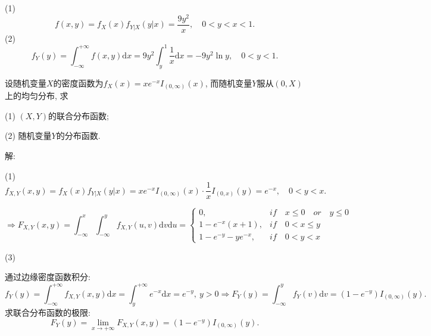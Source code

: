 \documentclass[standard]{ExBook}
\begin{document}
\begin{qitems}
\begin{bbox}
(1)
$$f(x,y)=f_{X}(x)f_{Y|X}(y|x)=\displaystyle\frac{9y^2}{x},\quad 0<y<x<1.$$
(2)
$$f_{Y}(y)=\displaystyle\int_{-\infty}^{+\infty}f(x,y)\mathrm{d}x=9y^2\int_{y}^{1}\frac{1}{x}\mathrm{d}x=-9y^2\ln y,\quad 0<y<1.$$
    \end{bbox}

\vspace{-5em}

    \begin{bbox}
    \begin{shaded}
        \qitem
设随机变量$X$的密度函数为$f_{X}(x)=x e^{-x}I_{(0,\infty)}(x)$, 而随机变量$Y$服从$(0,X)$上的均匀分布, 求

(1) $(X,Y)$的联合分布函数;

(2) 随机变量$Y$的分布函数.
    \end{shaded}
    \end{bbox}

\vspace{-5em}

    \begin{bbox}
解: 

(1)
$$f_{X,Y}(x,y)=f_{X}(x)f_{Y|X}(y|x)=x e^{-x}I_{(0,\infty)}(x)\cdot \frac{1}{x}I_{(0,x)}(y)=e^{-x},\quad 0<y<x.$$
\vspace{-2em}
\begin{center}
\begin{equation}
    \Longrightarrow
    F_{X,Y}(x,y)=\displaystyle\int_{-\infty}^{x}\int_{-\infty}^{y}f_{X,Y}(u,v)\mathrm{d}v\mathrm{d}u=
    \left\{
    \begin{array}{cl}
        \nonumber
        0, & if\quad x\leq0\quad or\quad y\leq0\\
        1-e^{-x}(x+1), & if\quad 0<x\leq y\\
        1-e^{-y}-ye^{-x}, & if\quad 0<y<x
    \end{array}
    \right.
\end{equation}
\end{center}
(3)

 通过边缘密度函数积分:
$$f_{Y}(y)=\int_{-\infty}^{+\infty}f_{X,Y}(x,y)\mathrm{d}x=\int_{y}^{+\infty}e^{-x}\mathrm{d}x=e^{-y},\ y>0 \Longrightarrow F_{Y}(y)=\int_{-\infty}^{y}f_{Y}(v)\mathrm{d}v=(1-e^{-y})I_{(0,\infty)}(y).$$
 求联合分布函数的极限:
$$F_{Y}(y)=\lim\limits_{x\to+\infty}F_{X,Y}(x,y)=(1-e^{-y})I_{(0,\infty)}(y).$$
    \end{bbox}

\vspace{-5em}


\end{qitems}
\end{document}
